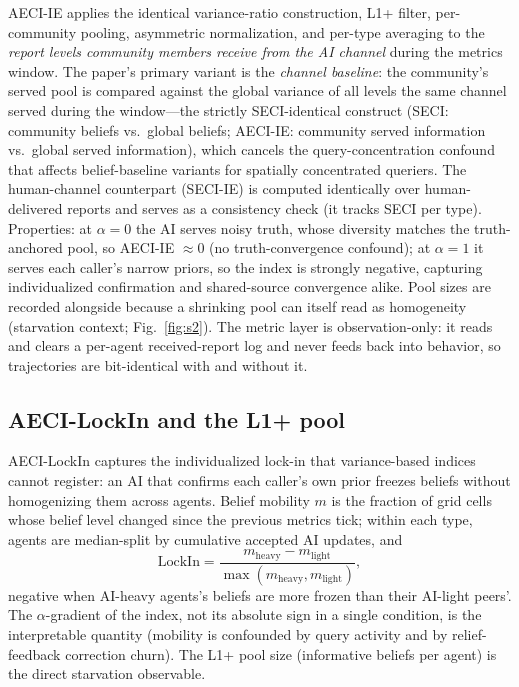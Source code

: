\documentclass[11pt]{article}
\begin{document}
AECI-IE applies the identical variance-ratio construction, L1+ filter,
per-community pooling, asymmetric normalization, and per-type averaging
to the \emph{report levels community members receive from the AI
channel} during the metrics window. The paper's primary variant is the
\emph{channel baseline}: the community's served pool is compared against
the global variance of all levels the same channel served during the
window---the strictly SECI-identical construct (SECI: community beliefs
vs.\ global beliefs; AECI-IE: community served information vs.\ global
served information), which cancels the query-concentration confound that
affects belief-baseline variants for spatially concentrated queriers.
The human-channel counterpart (SECI-IE) is computed identically over
human-delivered reports and serves as a consistency check (it tracks
SECI per type). Properties: at $\alpha = 0$ the AI serves noisy truth,
whose diversity matches the truth-anchored pool, so AECI-IE $\approx 0$
(no truth-convergence confound); at $\alpha = 1$ it serves each caller's
narrow priors, so the index is strongly negative, capturing
individualized confirmation and shared-source convergence alike. Pool
sizes are recorded alongside because a shrinking pool can itself read as
homogeneity (starvation context; Fig.~\ref{fig:s2}). The metric layer is
observation-only: it reads and clears a per-agent received-report log and
never feeds back into behavior, so trajectories are bit-identical with
and without it.

\subsection{AECI-LockIn and the L1+ pool}

AECI-LockIn captures the individualized lock-in that variance-based
indices cannot register: an AI that confirms each caller's own prior
freezes beliefs without homogenizing them across agents. Belief mobility
$m$ is the fraction of grid cells whose belief level changed since the
previous metrics tick; within each type, agents are median-split by
cumulative accepted AI updates, and
\begin{equation}
  \mathrm{LockIn} = \frac{m_{\mathrm{heavy}} - m_{\mathrm{light}}}{\max(m_{\mathrm{heavy}}, m_{\mathrm{light}})},
  \label{eq:lockin}
\end{equation}
negative when AI-heavy agents's beliefs are more frozen than their
AI-light peers'. The $\alpha$-gradient of the index, not its absolute
sign in a single condition, is the interpretable quantity (mobility is
confounded by query activity and by relief-feedback correction churn).
The L1+ pool size (informative beliefs per agent) is the direct
starvation observable.
\end{document}
